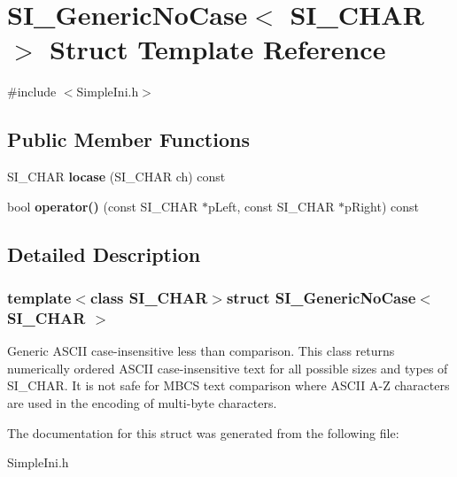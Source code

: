 \hypertarget{a00038}{}\section{S\+I\+\_\+\+Generic\+No\+Case$<$ S\+I\+\_\+\+C\+H\+A\+R $>$ Struct Template Reference}
\label{a00038}


{\ttfamily \#include $<$Simple\+Ini.\+h$>$}

\subsection*{Public Member Functions}
\begin{DoxyCompactItemize}
\item 
\hypertarget{a00038_adc6bb2ca8960d24913b598a2f3085e7c}{}S\+I\+\_\+\+C\+H\+A\+R {\bfseries locase} (S\+I\+\_\+\+C\+H\+A\+R ch) const \label{a00038_adc6bb2ca8960d24913b598a2f3085e7c}

\item 
\hypertarget{a00038_aa8014f86b3d74b2cd0f6e9b6ccc43426}{}bool {\bfseries operator()} (const S\+I\+\_\+\+C\+H\+A\+R $\ast$p\+Left, const S\+I\+\_\+\+C\+H\+A\+R $\ast$p\+Right) const \label{a00038_aa8014f86b3d74b2cd0f6e9b6ccc43426}

\end{DoxyCompactItemize}


\subsection{Detailed Description}
\subsubsection*{template$<$class S\+I\+\_\+\+C\+H\+A\+R$>$struct S\+I\+\_\+\+Generic\+No\+Case$<$ S\+I\+\_\+\+C\+H\+A\+R $>$}

Generic A\+S\+C\+I\+I case-\/insensitive less than comparison. This class returns numerically ordered A\+S\+C\+I\+I case-\/insensitive text for all possible sizes and types of S\+I\+\_\+\+C\+H\+A\+R. It is not safe for M\+B\+C\+S text comparison where A\+S\+C\+I\+I A-\/\+Z characters are used in the encoding of multi-\/byte characters. 

The documentation for this struct was generated from the following file\+:\begin{DoxyCompactItemize}
\item 
Simple\+Ini.\+h\end{DoxyCompactItemize}
